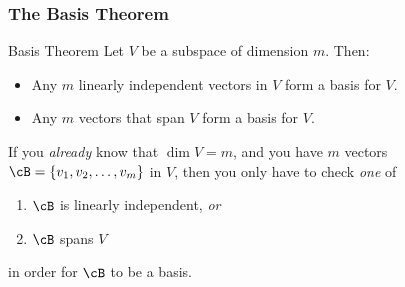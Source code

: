 
\begin{frame}
\frametitle{The Basis Theorem}

\vskip-3mm
\begin{oneoffthm}{Basis Theorem}
  Let $V$ be a subspace of dimension $m$.  Then:
  \begin{itemize}
    \pause
  \item Any $m$ linearly independent vectors in $V$ form a basis for $V$.
    \pause
  \item Any $m$ vectors that span $V$ form a basis for $V$.
  \end{itemize}
\end{oneoffthm}

\pause\bigskip
\begin{bluebox}[Upshot]{.7\linewidth}
  If you \emph{already} know that $\dim V = m$, and you have $m$ vectors
  $\cB = \{v_1,v_2,\ldots,v_m\}$ in $V$, then you only have to check \emph{one} of
  \smallskip
  \begin{enumerate}
  \item<5-> $\cB$ is linearly independent, \emph{or}
  \item<6-> $\cB$ spans $V$
  \end{enumerate}
  \smallskip
  {in order for $\cB$ to be a basis.}
\end{bluebox}

\end{frame}



